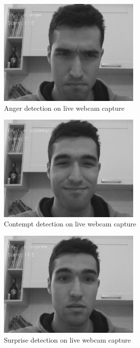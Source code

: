 \begin{figure}
  \centering
  \includegraphics[width=7cm]{./images/db_anger.png}
  \caption{Anger detection on live webcam capture}
  \label{fig:exampl_anger}
\end{figure}

\begin{figure}
  \centering
  \includegraphics[width=7cm]{./images/db_contempt.png}
  \caption{Contempt detection on live webcam capture}
  \label{fig:exampl_contempt}
\end{figure}

\begin{figure}
  \centering
  \includegraphics[width=7cm]{./images/db_surprise.png}
  \caption{Surprise detection on live webcam capture}
  \label{fig:exampl_surprise}
\end{figure}
\newpage
